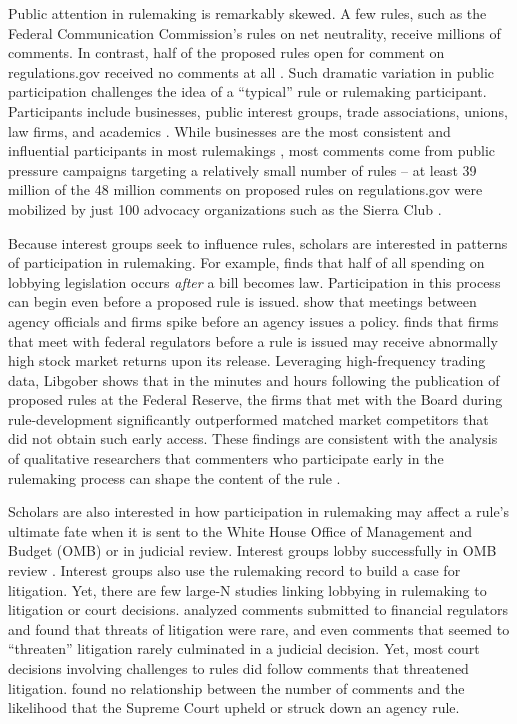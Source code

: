 \documentclass[
      12pt,
        ]{article}
\begin{document}
Public attention in rulemaking is remarkably skewed. A few rules, such
as the Federal Communication Commission's rules on net neutrality,
receive millions of comments. In contrast, half of the proposed rules
open for comment on regulations.gov received no comments at all
\citep{LibgoberJOP}. Such dramatic variation in public participation
challenges the idea of a ``typical'' rule or rulemaking participant.
Participants include businesses, public interest groups, trade
associations, unions, law firms, and academics
\citep{CuellarALR2005, YackeeJOP2006}. While businesses are the most
consistent and influential participants in most rulemakings
\citep{YackeeJOP2006, LibgoberJOP}, most comments come from public
pressure campaigns targeting a relatively small number of rules -- at
least 39 million of the 48 million comments on proposed rules on
regulations.gov were mobilized by just 100 advocacy organizations such
as the Sierra Club \citep{judgelord2019SPSA}.

Because interest groups seek to influence rules, scholars are interested
in patterns of participation in rulemaking. For example,
\citet{YouJOP2017} finds that half of all spending on lobbying
legislation occurs \emph{after} a bill becomes law. Participation in
this process can begin even before a proposed rule is issued.
\citet{deFigureidoKimICC2004} show that meetings between agency
officials and firms spike before an agency issues a policy.
\citet{LibgoberQJPS} finds that firms that meet with federal regulators
before a rule is issued may receive abnormally high stock market returns
upon its release. Leveraging high-frequency trading data, Libgober shows
that in the minutes and hours following the publication of proposed
rules at the Federal Reserve, the firms that met with the Board during
rule-development significantly outperformed matched market competitors
that did not obtain such early access. These findings are consistent
with the analysis of qualitative researchers that commenters who
participate early in the rulemaking process can shape the content of the
rule \citep{NaughtonJPAM2009}.

Scholars are also interested in how participation in rulemaking may
affect a rule's ultimate fate when it is sent to the White House Office
of Management and Budget (OMB) or in judicial review. Interest groups
lobby successfully in OMB review \citep{HaederAPSR2015}. Interest groups
also use the rulemaking record to build a case for litigation. Yet,
there are few large-N studies linking lobbying in rulemaking to
litigation or court decisions. \citet{LibgoberRashin2018SPSA} analyzed
comments submitted to financial regulators and found that threats of
litigation were rare, and even comments that seemed to ``threaten''
litigation rarely culminated in a judicial decision. Yet, most court
decisions involving challenges to rules did follow comments that
threatened litigation. \citet{judgelord2016MPSA} found no relationship
between the number of comments and the likelihood that the Supreme Court
upheld or struck down an agency rule.
\end{document}
